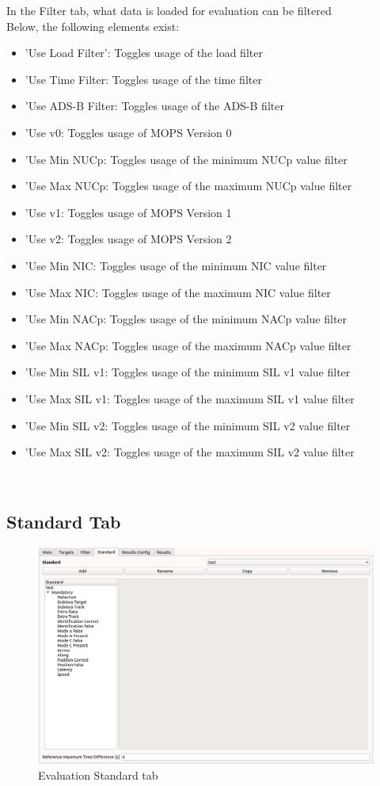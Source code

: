 In the Filter tab, what data is loaded for evaluation can be filtered \\

Below, the following elements exist:
\begin{itemize}  
\item 'Use Load Filter': Toggles usage of the load filter
\item 'Use Time Filter: Toggles usage of the time filter
\item 'Use ADS-B Filter: Toggles usage of the ADS-B filter
\item 'Use v0: Toggles usage of MOPS Version 0
\item 'Use Min NUCp: Toggles usage of the minimum NUCp value filter
\item 'Use Max NUCp: Toggles usage of the maximum NUCp value filter
\item 'Use v1: Toggles usage of MOPS Version 1
\item 'Use v2: Toggles usage of MOPS Version 2
\item 'Use Min NIC: Toggles usage of the minimum NIC value filter
\item 'Use Max NIC: Toggles usage of the maximum NIC value filter
\item 'Use Min NACp: Toggles usage of the minimum NACp value filter
\item 'Use Max NACp: Toggles usage of the maximum NACp value filter
\item 'Use Min SIL v1: Toggles usage of the minimum SIL v1 value filter
\item 'Use Max SIL v1: Toggles usage of the maximum SIL v1 value filter
\item 'Use Min SIL v2: Toggles usage of the minimum SIL v2 value filter
\item 'Use Max SIL v2: Toggles usage of the maximum SIL v2 value filter
\end{itemize}
\ \\

\subsection{Standard Tab}

\begin{figure}[H]
  \hspace*{-2cm}
    \includegraphics[width=18cm,frame]{figures/eval_standard.png}
  \caption{Evaluation Standard tab}
\end{figure}


